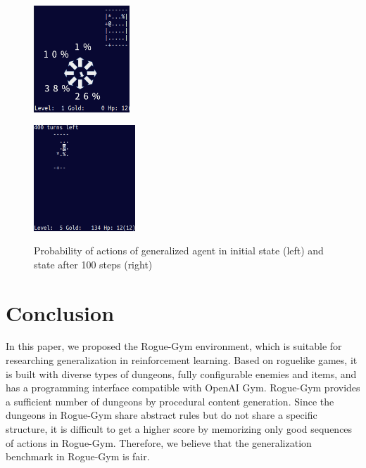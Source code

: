 \documentclass[conference]{IEEEtran}
\newcommand\pcg{procedural content generation} %
\begin{document}
\begin{figure}[t]
 \centering
  \begin{minipage}[cbt]{3.6cm}
   \centering
   \includegraphics[width=3.6cm]{pictures/init-l2-40.png}
    \label{l240-ini}
  \end{minipage}
  \begin{minipage}[cbt]{3.8cm}
   \centering
   \includegraphics[width=3.8cm]{pictures/t400-l240.png}
    \label{l240-100t}
  \end{minipage}
 \caption{Probability of actions of generalized agent in
   initial state (left) and state after 100 steps (right)} \label{l240-act}
\end{figure}

\section{Conclusion}\label{section:conclusion}
In this paper, we proposed the Rogue-Gym environment, which is suitable
for researching generalization in reinforcement learning.
Based on roguelike games, it is built with diverse types of dungeons,
fully configurable enemies and items, and has a programming interface
compatible with OpenAI Gym.
Rogue-Gym provides a sufficient number of dungeons by \pcg{}.
Since the dungeons in Rogue-Gym share abstract rules but do not share a
specific structure, it is difficult to get a higher score by memorizing
only good sequences of actions in Rogue-Gym.
Therefore, we believe that the generalization benchmark in Rogue-Gym is fair.
\end{document}
